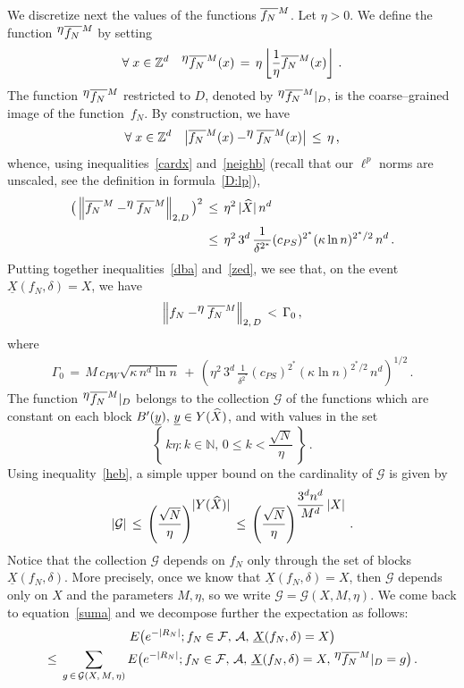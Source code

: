 \documentclass[10pt]{amsart}
\theoremstyle{definition}\newtheorem{defi}[theo]{Definition}\newtheorem{rema}[theo]{Remark}\newtheorem{exam}[theo]{Example}\newtheorem{exem}[theo]{Example}\newtheorem{nota}[theo]{Notation}
\newcommand{\XX}{{\underline{X}}}
\newcommand{\yy}{{\underline{y}}}
\newcommand*\fmn{\overline{f_N\,}^{\lower2pt\hbox{$\scriptstyle M$}}}
\newcommand*\fmne{^{\displaystyle \eta}\overline{f_N\,}^{\lower2pt\hbox{$\scriptstyle M$}}}
\newcommand*\Zd {{\mathbb Z^d}}
\newcommand*\N {{\mathbb N}}
\newcommand*\hX{\smash{\widehat X}}
\newcommand{\cA}{\mathcal{A}}
\newcommand{\cF}{\mathcal{F}}
\newcommand{\cG}{\mathcal{G}}
\renewcommand{\N}{\mathbb{N}}
\let\oldforall\forall
\renewcommand*{\forall}{\mathrel{\oldforall}}
\begin{document}
We discretize next the values of the functions $\fmn$. Let $\eta>0$. We define the function $\fmne$ by setting
\[
\forall x\in\Zd\quad
\fmne(x)\,=\, \eta\left\lfloor
\frac{1}{\eta}{\fmn(x)}
\right\rfloor
\,.
\]
The function $\fmne$ restricted to $D$, denoted by $\fmne|_D$, is the coarse--grained image of the function~$f_N$. By construction, we have
\[
\forall x\in \Zd\quad
\big|\fmn(x)-\fmne(x)\big|\,\leq\,\eta\,,
\]
whence, using inequalities~\eqref{cardx} and~\eqref{neighb} (recall that our $\ell^p$ norms are unscaled, see the definition in formula~\eqref{D:lp}),
\begin{equation}\label{zed}
\begin{aligned}
\big(\left\|\fmn-\fmne\right\|_{2,D}\big)^2&\,\leq\,
\eta^2\,|\hX|\,n^d\\ &\,\leq\,
\eta^2\,3^d\,
\frac{1} { \delta^{2^*}} (c_{PS})^{2^*} (\kappa\ln n)^{2^*/2}
\,n^d\,.
\end{aligned}
\end{equation}
Putting together inequalities~\eqref{dba} and~\eqref{zed}, we see that, on the event $\XX(f_N,\delta)=X$, we have
\begin{equation}\label{rty}
\left\|f_N-\fmne\right\|_{2,\,D}\,<\,\Gamma_0\,,
\end{equation}
where
\begin{align}
\Gamma_0\,=\, M\,c_{PW}
\sqrt{\kappa \,n^d\ln n}
\,+\,
\left(\eta^2\,3^d\,
\frac{1} { \delta^{2^*}} (c_{PS})^{2^*} (\kappa\ln n)^{2^*/2}
\,n^d\right)^{1/2}\,.
\end{align}
The function $\fmne|_D$ belongs to the collection $\cG$ of the functions which are constant on each block $B'(\yy),\,\yy\in Y(\hX)$, and with values in the set
\[
\left\{\,k\eta:k\in\N,\,0\leq k< \frac{\sqrt{N}}{\eta}\,\right\}\,.
\]
Using inequality~\eqref{heb}, a simple upper bound on the cardinality of $\cG$ is given by
\begin{equation}\label{sib}
|\cG|
\,\leq\,
\left(\frac{\sqrt{N}}{\eta}\right)^{\displaystyle|Y(\hX)|}
\,\leq\,
\left(\frac{\sqrt{N}}{\eta}\right)^{\displaystyle
\frac{3^dn^d}{M^d}\,|X|}
\,.
\end{equation}
Notice that the collection $\cG$ depends on $f_N$ only through the set of blocks $\XX(f_N,\delta)$. More precisely, once we know that $\XX(f_N,\delta)=X$, then $\cG$ depends only on $X$ and the parameters $M,\eta$, so we write $\cG=\cG(X,M,\eta)$. We come back to equation~\eqref{suma} and we decompose further the expectation as follows:
\begin{multline}\label{sumb}
E\big(e^{-|R_N|};f_N\in\cF,\,\cA,\,\XX(f_N,\delta)=X\big)\\
\leq\,\sum_{g\,\in\,\cG(X,\,M,\,\eta)} E\big(e^{-|R_N|}; f_N\in\cF,\,\cA,\,\XX(f_N,\delta)=X,\,
\fmne|_D=g
\big)\,.
\end{multline}
\end{document}
